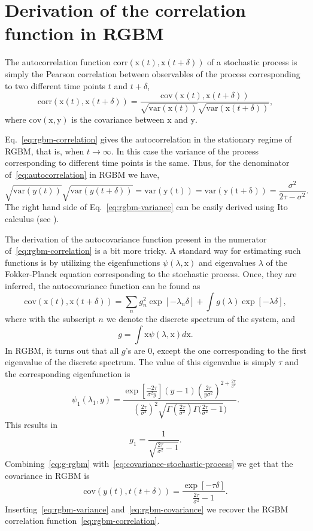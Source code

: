 \documentclass[11pt]{article}
\newcommand{\be}{\begin{equation}}
\newcommand{\ee}{\end{equation}}
\numberwithin{equation}{section}
\begin{document}
\section{Derivation of the correlation function in RGBM}\label{sec:rgbm-correlation-function}

The autocorrelation function $\mathrm{corr}(\mathrm{x}(t), \mathrm{x}(t+\delta))$ of a stochastic process is simply the Pearson correlation between observables of the process corresponding to two different time points $t$ and $t+\delta$, 
\be
    \mathrm{corr}(\mathrm{x}(t), \mathrm{x}(t+\delta)) = \frac{\mathrm{cov}(\mathrm{x}(t), \mathrm{x}(t+\delta))}{\sqrt{\mathrm{var}(\mathrm{x}(t))} \sqrt{\mathrm{var}(\mathrm{x}(t+\delta))}},
    \label{eq:autocorrelation}
\ee
where $\mathrm{cov}(\mathrm{x}, \mathrm{y})$ is the covariance between $\mathrm{x}$ and $\mathrm{y}$.

Eq.~\eqref{eq:rgbm-correlation} gives the autocorrelation in the stationary regime of RGBM, that is, when $t \to \infty$. In this case the variance of the process corresponding to different time points is the same. Thus, for the denominator of~\eqref{eq:autocorrelation} in RGBM we have,
\be
   \sqrt{\mathrm{var}(y(t))} \sqrt{\mathrm{var}(y(t+\delta))} = \mathrm{var(y(t))} = \mathrm{var(y(t+\delta))} = \frac{\sigma^2}{2\tau - \sigma^2}.
    \label{eq:rgbm-variance}
\ee
The right hand side of Eq.~\eqref{eq:rgbm-variance} can be easily derived using Ito calculus (see \citet{BermanPetersAdamou2019}).

The derivation of the autocovariance function present in the numerator of~\eqref{eq:rgbm-correlation} is a bit more tricky. A standard way for estimating such functions is by utilizing the eigenfunctions $\psi(\lambda,\mathrm{x})$ and eigenvalues $\lambda$ of the Fokker-Planck equation corresponding to the stochastic process. Once, they are inferred, the autocovariance function can be found as
\be
\mathrm{cov}(\mathrm{x}(t), \mathrm{x}(t+\delta)) = \sum_n g_n^2 \exp\left[ -\lambda_n \delta \right] + \int g(\lambda)\exp\left[ -\lambda \delta \right],
\label{eq:covariance-stochastic-process}
\ee
where with the subscript $n$ we denote the discrete spectrum of the system, and
\be
g = \int \mathrm{x} \psi(\lambda,\mathrm{x}) d\mathrm{x}.
\ee
In RGBM, it turns out that all $g$'s are 0, except the one corresponding to the first eigenvalue of the discrete spectrum. The value of this eigenvalue is simply $\tau$ and the corresponding eigenfunction is \citep{LiuSerota2017}
%
\be
\psi_1(\lambda_1,y) = \frac{\exp\left[\frac{-2\tau}{\sigma^2 y}\right](y-1) (\frac{2\tau}{y \sigma^2})^{2+\frac{2\tau}{\sigma^2}}}{(\frac{2\tau}{\sigma^2})^2\sqrt{\Gamma (\frac{2\tau}{\sigma^2}) \Gamma (\frac{2\tau}{\sigma^2}-1})}.
\label{eq:eigenfunction-rgbm}
\ee
This results in
\be
g_1 = \frac{1}{\sqrt{\frac{2\tau}{\sigma^2}-1}}.
\label{eq:g-rgbm}
\ee
Combining~\eqref{eq:g-rgbm} with~\ref{eq:covariance-stochastic-process} we get that the covariance in RGBM is
\be
\mathrm{cov}(y(t), t(t+\delta)) = \frac{\exp\left[-\tau \delta\right]}{\frac{2\tau}{\sigma^2}-1}.
\label{eq:rgbm-covariance}
\ee
Inserting~\eqref{eq:rgbm-variance} and~\eqref{eq:rgbm-covariance} we recover the RGBM correlation function~\eqref{eq:rgbm-correlation}.
\end{document}
